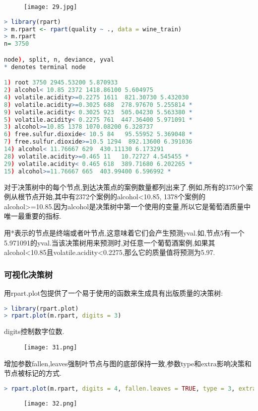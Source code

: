 \documentclass[11pt,a4paper,oneside]{book}
\begin{document}
\begin{figure}[H]
	\centering
	\texttt{[image: 29.jpg]}
\end{figure}
\begin{lstlisting}[language=r]
> library(rpart)
> m.rpart <- rpart(quality ~ ., data = wine_train)
> m.rpart
n= 3750 

node), split, n, deviance, yval
* denotes terminal node

1) root 3750 2945.53200 5.870933  
2) alcohol< 10.85 2372 1418.86100 5.604975  
4) volatile.acidity>=0.2275 1611  821.30730 5.432030  
8) volatile.acidity>=0.3025 688  278.97670 5.255814 *
9) volatile.acidity< 0.3025 923  505.04230 5.563380 *
5) volatile.acidity< 0.2275 761  447.36400 5.971091 *
3) alcohol>=10.85 1378 1070.08200 6.328737  
6) free.sulfur.dioxide< 10.5 84   95.55952 5.369048 *
7) free.sulfur.dioxide>=10.5 1294  892.13600 6.391036  
14) alcohol< 11.76667 629  430.11130 6.173291  
28) volatile.acidity>=0.465 11   10.72727 4.545455 *
29) volatile.acidity< 0.465 618  389.71680 6.202265 *
15) alcohol>=11.76667 665  403.99400 6.596992 *
\end{lstlisting}

对于决策树中的每个节点,到达决策点的案例数量都列出来了.例如,所有的3750个案例从根节点开始,其中有2372个案例的alcohol<10.85, 1378个案例的alcohol>=10.85.因为alcohol是决策树中第一个使用的变量,所以它是葡萄酒质量中唯一最重要的指标.

用*表示的节点是终端或者叶节点,这意味着它们会产生预测yval.如,节点5有一个5.971091的yval.当该决策树用来预测时,对任意一个葡萄酒案例,如果其alcohol<10.85且volatile.acidity<0.2275,那么它的质量值将预测为5.97.

\subsubsection{可视化决策树}
用rpart.plot包提供了一个易于使用的函数来生成具有出版质量的决策树:
\begin{lstlisting}[language=r]
> library(rpart.plot)
> rpart.plot(m.rpart, digits = 3)
\end{lstlisting}
digits控制数字位数.
\begin{figure}[H]
	\centering
	\texttt{[image: 31.png]}
\end{figure}

增加参数fallen,leaves强制叶节点与图的底部保持一致,参数type和extra影响决策和节点被标记的方式.
\begin{lstlisting}[language=r]
> rpart.plot(m.rpart, digits = 4, fallen.leaves = TRUE, type = 3, extra = 101)
\end{lstlisting}
\begin{figure}[H]
	\centering
	\texttt{[image: 32.png]}
\end{figure}
\end{document}
